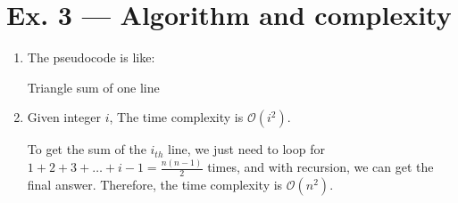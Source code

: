 \documentclass[12pt, a4paper]{article}
\begin{document}
\section*{Ex. 3 --- Algorithm and complexity}
\begin{enumerate}
    \item The pseudocode is like:

          \begin{algorithm}[!htb]
              \caption{Triangle sum of one line}


          \end{algorithm}
    \item Given integer $i$, The time complexity is $\mathcal{O}(i^2)$.
          
          To get the sum of the $i_{th}$ line, we just need to loop for $1 + 2 + 3 + \dots + i - 1 = \frac{n(n-1)}{2}$ times, 
          and with recursion, we can get the final answer. Therefore, the time complexity is $\mathcal{O}(n^2)$.

\end{enumerate}
\end{document}
